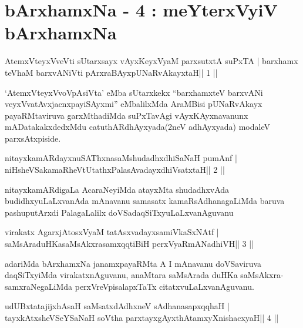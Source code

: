 \chapter{bArxhamxNa - 4 : meYterxVyiV bArxhamxNa}



\begin{shl}
AtemxVteyxVveVti sUtarxsayx vAyxKeyxVyaM parxsutxtA suPxTA |
barxhamx teV\s haM barxvANiVti pArxraBAyx\s\s pUNaRvAkayxtaH\hfill || 1 ||
\end{shl}

\begin{artha}
`AtemxVteyxVvoVpAsiVta' eMba sUtarxkekx ``barxhamxteV barxvANi veyxVvatAvx\break jacnxpayiSAyxmi'' eMbalilxMda AraMBisi pUNaRvAkayx payaRMtaviruva garxMthadiMda suPxTavAgi vAyxKAyxnavanunx mADatakakxdedxMdu catuthARdhAyxyada(2neV adhAyxyada) modaleV parxsAtxpiside.
\end{artha}


\begin{shl}
nitayxkamARdayxnuSAThxnasaMshudadhxdhiSaNaH pumAnf |
niHsheVSakamaRheVtUtathxPalasAvadayxdhiVsatxtaH\hfill || 2 ||
\end{shl}

\begin{artha}
nitayxkamARdigaLa AcaraNeyiMda atayxMta shudadhxvAda
budidhxyuLaLxvanAda mAnavanu samasatx kamaRsAdhanagaLiMda baruva
pashuputArxdi PalagaLalilx doVSadaqSiTxyuLaLxvanAguvanu
\end{artha}

\begin{shl}
virakatx AgarxjAtosxV\s yaM tatAsxvadayxsamiVkaSxNAtf |
saMsAraduHKasaMsAkxrasamxqqtiBiH perxVyaRmANadhiVH\hfill || 3 ||
\end{shl}

\begin{artha}
adariMda bArxhamxNa janamxpayaRMta A I mAnavanu doVSaviruva
daqSiTxyiMda virakatxnAguvanu, anaMtara saMsArada duHKa
saMsAkxra-samxraNegaLiMda perxVreVpisalapxTaTx citatxvuLaLxvanAguvanu. 
\end{artha}

\begin{shl}
udUBxtatajijxhAsaH saMsatxdAdhxneV sAdhanasapxqqhaH |
tayxkAtxsheVSeYSaNaH soV\s tha parxtayxgAyxthAtamxyXnishacxyaH\hfill || 4 ||
\end{shl}


